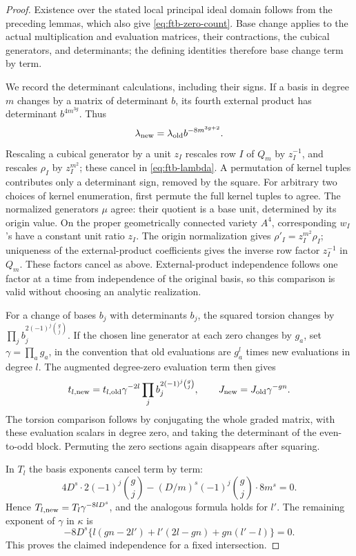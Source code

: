 \begin{proof}
Existence over the stated local principal ideal domain follows from
the preceding lemmas, which also give \eqref{eq:ftb-zero-count}.
Base change applies to the actual multiplication and evaluation
matrices, their contractions, the cubical generators, and determinants;
the defining identities therefore base change term by term.

We record the determinant calculations, including their signs.
If a basis in degree \(m\) changes by a matrix of determinant \(b\),
its fourth external product has determinant \(b^{4m^{3g}}\).
Thus
\[
             \lambda_{\rm new}
                   =\lambda_{\rm old}b^{-8m^{3g+2}}.
\]
Rescaling a cubical generator by a unit \(z_I\) rescales row \(I\)
of \(Q_m\) by \(z_I^{-1}\), and rescales \(\rho_I\) by
\(z_I^{m^2}\); these cancel in \eqref{eq:ftb-lambda}.
A permutation of kernel tuples contributes only a determinant sign,
removed by the square.  For arbitrary two choices of kernel enumeration, first permute the
full kernel tuples to agree.  The normalized generators \(\mu\)
agree: their quotient is a base unit, determined by its origin value.
On the proper geometrically connected variety \(A^4\), corresponding
\(w_I\)'s have a constant unit ratio \(z_I\).
The origin normalization gives
\(\rho'_I=z_I^{m^2}\rho_I\); uniqueness of the external-product
coefficients gives the inverse row factor \(z_I^{-1}\) in \(Q_m\).
These factors cancel as above.  External-product independence follows
one factor at a time from independence of the original basis, so this
comparison is valid without choosing an analytic realization.

For a change of bases \(b_j\) with determinants \(b_j\), the squared
torsion changes by
\(\prod_jb_j^{2(-1)^j\binom gj}\).
If the chosen line generator at each zero changes by \(g_a\), set
\(\gamma=\prod_ag_a\), in the convention that old evaluations are
\(g_a^l\) times new evaluations in degree \(l\).
The augmented degree-zero evaluation term then gives
\[
 t_{l,\rm new}
   =t_{l,\rm old}\gamma^{-2l}
                    \prod_jb_j^{2(-1)^j\binom gj},
 \qquad J_{\rm new}=J_{\rm old}\gamma^{-gn}.
\]
The torsion comparison follows by conjugating the whole graded
matrix, with these evaluation scalars in degree zero, and taking
the determinant of the even-to-odd block.  Permuting the zero
sections again disappears after squaring.

In \(T_l\) the basis exponents cancel term by term:
\[
 4D^s\cdot2(-1)^j\binom gj
 -(D/m)^s(-1)^j\binom gj\cdot8m^s=0.
\]
Hence \(T_{l,\rm new}=T_l\gamma^{-8lD^s}\), and the analogous
formula holds for \(l'\).
The remaining exponent of \(\gamma\) in \(\kappa\) is
\[
 -8D^s\{l(gn-2l')+l'(2l-gn)+gn(l'-l)\}=0 .
\]
This proves the claimed independence for a fixed intersection.


\end{proof}
